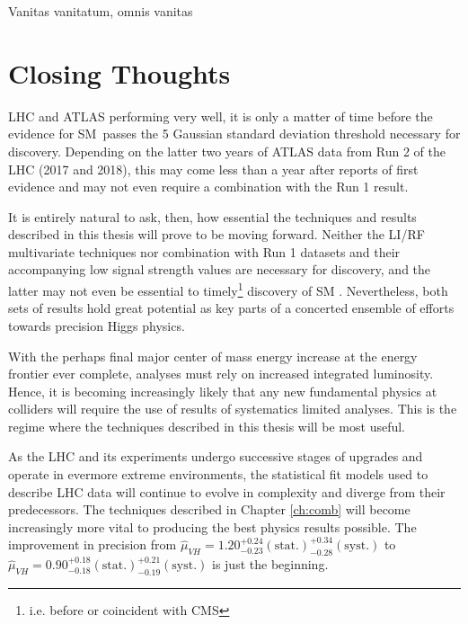 \begin{savequote}[75mm]
Vanitas vanitatum, omnis vanitas
\end{savequote}

\chapter{Closing Thoughts}

 LHC and ATLAS performing very well, it is only a matter of time before the evidence for SM \vhbb\,passes the 5 Gaussian standard deviation threshold necessary for discovery.  Depending on the latter two years of ATLAS data from Run 2 of the LHC (2017 and 2018), this may come less than a year after reports of first evidence and may not even require a combination with the Run 1 result.  

It is entirely natural to ask, then, how essential the techniques and results described in this thesis will prove to be moving forward.  Neither the LI/RF multivariate techniques nor combination with Run 1 datasets and their accompanying low signal strength values are necessary for discovery, and the latter may not even be essential to timely\footnote{i.e. before or coincident with CMS} discovery of SM \vhbb.  Nevertheless, both sets of results hold great potential as key parts of a concerted ensemble of efforts towards precision Higgs physics.

With the perhaps final major center of mass energy increase at the energy frontier ever complete, analyses must rely on increased integrated luminosity.  Hence, it is becoming increasingly likely that any new fundamental physics at colliders will require the use of results of systematics limited analyses.  This is the regime where the techniques described in this thesis will be most useful.

As the LHC and its experiments undergo successive stages of upgrades and operate in evermore extreme environments, the statistical fit models used to describe LHC data will continue to evolve in complexity and diverge from their predecessors.  The techniques described in Chapter \ref{ch:comb} will become increasingly more vital to producing the best physics results possible.  The improvement in precision from $\hat{\mu}_{VH}=1.20^{+0.24}_{-0.23}(\textrm{stat.})^{+0.34}_{-0.28}(\textrm{syst.})$ to $\hat{\mu}_{VH}=0.90^{+0.18}_{-0.18}(\textrm{stat.})^{+0.21}_{-0.19}(\textrm{syst.})$ is just the beginning.

